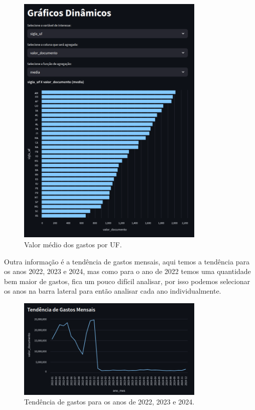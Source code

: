 \documentclass[12pt, a4paper]{article}
\begin{document}
\begin{figure}[!htbp]
	\centering
	\includegraphics[width=0.8\textwidth]{assets/2_plot8.png}
	\caption{Valor médio dos gastos por UF.}
	\label{fig:criacao_postgresql}
\end{figure}

Outra informação é a tendência de gastos mensais, aqui temos a tendência para os anos 2022, 2023 e 2024, mas como para o ano de 2022 temos uma quantidade bem maior de gastos, fica um pouco difícil analisar, por isso podemos selecionar os anos na barra lateral para então analisar cada ano individualmente.

\begin{figure}[!htbp]
	\centering
	\includegraphics[width=0.8\textwidth]{assets/2_plot9.png}
	\caption{Tendência de gastos para os anos de 2022, 2023 e 2024.}
	\label{fig:tendencia de gastos}
\end{figure}
\end{document}
